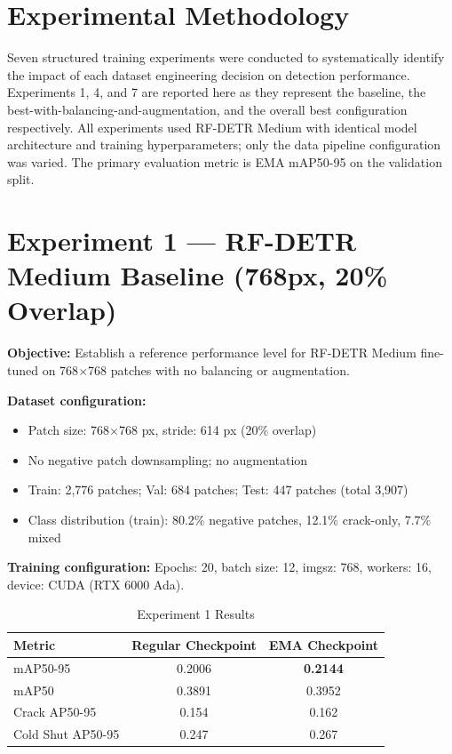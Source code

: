 \section{Experimental Methodology}

Seven structured training experiments were conducted to systematically identify the impact of each dataset engineering decision on detection performance. Experiments 1, 4, and 7 are reported here as they represent the baseline, the best-with-balancing-and-augmentation, and the overall best configuration respectively. All experiments used RF-DETR Medium with identical model architecture and training hyperparameters; only the data pipeline configuration was varied. The primary evaluation metric is EMA mAP50-95 on the validation split.

\section{Experiment 1 --- RF-DETR Medium Baseline (768px, 20\% Overlap)}

\textbf{Objective:} Establish a reference performance level for RF-DETR Medium fine-tuned on 768$\times$768 patches with no balancing or augmentation.

\textbf{Dataset configuration:}
\begin{itemize}[leftmargin=2em]
    \item Patch size: 768$\times$768 px, stride: 614 px (20\% overlap)
    \item No negative patch downsampling; no augmentation
    \item Train: 2,776 patches; Val: 684 patches; Test: 447 patches (total 3,907)
    \item Class distribution (train): 80.2\% negative patches, 12.1\% crack-only, 7.7\% mixed
\end{itemize}

\textbf{Training configuration:} Epochs: 20, batch size: 12, imgsz: 768, workers: 16, device: CUDA (RTX 6000 Ada).

\begin{table}[H]
\centering
\caption{Experiment 1 Results}
\begin{tabular}{lcc}
\toprule
\rowcolor{tableHeader}\tableheadfont Metric & \tableheadfont Regular Checkpoint & \tableheadfont EMA Checkpoint \\
\midrule
mAP50-95       & 0.2006 & \textbf{0.2144} \\
\rowcolor{tableRowAlt}mAP50          & 0.3891 & 0.3952 \\
Crack AP50-95  & 0.154  & 0.162 \\
\rowcolor{tableRowAlt}Cold Shut AP50-95 & 0.247 & 0.267 \\
\bottomrule
\end{tabular}
\end{table}

